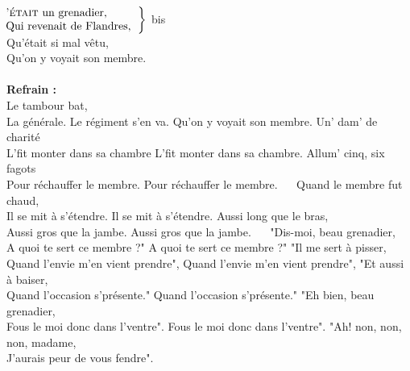 
 \\
$\left.\begin{tabular}{l}
\hspace{-0.4cm}
\textsc{'était} un grenadier,
\\
\hspace{-0.4cm}
Qui revenait de Flandres,
\end{tabular}\right\rbrace$ bis
\\Qu'était si mal vêtu,
\\Qu'on y voyait son membre.
\\\\\textbf{Refrain :}
\\Le tambour bat,
\\La générale.
{Le régiment s'en va.}
{Qu'on y voyait son membre.}
Un' dam' de charité
\\L'fit monter dans sa chambre
{L'fit monter dans sa chambre. }
Allum' cinq, six fagots
\\Pour réchauffer le membre.
{Pour réchauffer le membre. ~~}
Quand le membre fut chaud,
\\Il se mit à s'étendre.
{Il se mit à s'étendre.}
Aussi long que le bras,
\\Aussi gros que la jambe.
{Aussi gros que la jambe. ~~}
"Dis-moi, beau grenadier,
\\A quoi te sert ce membre ?"
\breakpage
{}
{A quoi te sert ce membre ?"}
"Il me sert à pisser,
\\Quand l'envie m'en vient prendre",
{Quand l'envie m'en vient prendre",}
"Et aussi à baiser,
\\Quand l'occasion s'présente."
{Quand l'occasion s'présente."}
"Eh bien, beau grenadier,
\\Fous le moi donc dans l'ventre".
{Fous le moi donc dans l'ventre".}
"Ah! non, non, non, madame,
\\J'aurais peur de vous fendre".
